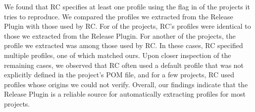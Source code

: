 \documentclass[smallextended]{svjour3}
\newcommand{\maven}[1]{\tool{Maven{#1}}}
\begin{document}
{We found that RC specifies at least one profile using the  flag in  of the projects it tries to reproduce. We compared the profiles we extracted from the \maven{} Release Plugin with those used by RC. For  of the projects, RC's profiles were identical to those we extracted from the \maven{} Release Plugin. For another  of the projects, the profile we extracted was among those used by RC. In these cases, RC specified multiple profiles, one of which matched ours. Upon closer inspection of the remaining cases, we observed that RC often used a default profile that was not explicitly defined in the project's POM file, and for a few projects, RC used profiles whose origins we could not verify. Overall, our findings indicate that the \maven{} Release Plugin is a reliable source for automatically extracting profiles for most projects.



}
\end{document}
